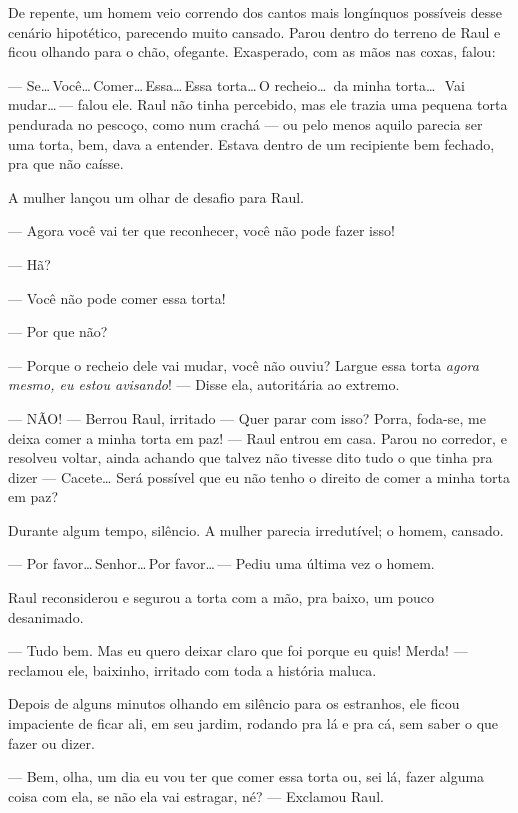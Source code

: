 De repente, um homem veio correndo dos cantos mais longínquos possíveis desse cenário hipotético, parecendo mui\-to cansado. Parou dentro do terreno de Raul e ficou olhando para o chão, ofegante. Exasperado, com as mãos nas coxas, falou:

\begin{sloppypar}
--- Se\ldots\,Você\ldots\,Comer\ldots\,Essa\ldots\,Essa torta\ldots\,O recheio\ldots\ da minha torta\ldots\,\ Vai mudar\ldots\,--- falou ele. Raul não tinha percebido, mas ele trazia uma pequena torta pendurada no pescoço, como num crachá --- ou pelo menos aquilo parecia ser uma torta, bem, dava a entender. Estava dentro de um recipiente bem fechado, pra que não caísse.
\end{sloppypar}

A mulher lançou um olhar de desafio para Raul.

--- Agora você vai ter que reconhecer, você não pode fazer isso!

--- Hã?

--- Você não pode comer essa torta!

--- Por que não?

--- Porque o recheio dele vai mudar, você não ouviu? Largue essa torta \emph{agora mesmo, eu estou avisando}! --- Disse ela, autoritária ao extremo.

--- NÃO! --- Berrou Raul, irritado --- Quer parar com isso? Porra, foda-se, me deixa comer a minha torta em paz! --- Raul entrou em casa. Parou no corredor, e resolveu voltar, ainda achando que talvez não tivesse dito tudo o que tinha pra dizer --- Cacete… Será possível que eu não tenho o direito de comer a minha torta em paz?

Durante algum tempo, silêncio. A mulher parecia irredutível; o homem, cansado.

--- Por favor\ldots\,Senhor\ldots\,Por favor\ldots\,--- Pediu uma última vez o homem.

Raul reconsiderou e segurou a torta com a mão, pra baixo, um pouco desanimado.

--- Tudo bem. Mas eu quero deixar claro que foi porque eu quis! Merda! --- reclamou ele, baixinho, irritado com toda a história maluca.

Depois de alguns minutos olhando em silêncio para os estranhos, ele ficou impaciente de ficar ali, em seu jardim, rodando pra lá e pra cá, sem saber o que fazer ou dizer.

--- Bem, olha, um dia eu vou ter que comer essa torta ou, sei lá, fazer alguma coisa com ela, se não ela vai estragar, né? --- Exclamou Raul.

